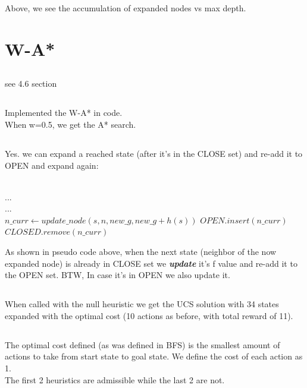 \documentclass[12pt]{article}
\begin{document}
Above, we see the accumulation of expanded nodes vs max depth.

\section{W-A*}
\subsection{}
see 4.6 section
\subsection{}
Implemented the W-A* in code.\\
When w=0.5, we get the A* search.
\subsection{}
Yes. we can expand a reached state (after it's in the CLOSE set) and re-add it to OPEN and expand again:\\
\begin{algorithmic}
\\
    ...
\\
    ...
\Else {}\\
        \State $n\_curr \gets update\_node(s, n, new\_g ,new\_g + h(s))$
        \State $OPEN.insert(n\_curr)$
        \State $CLOSED.remove(n\_curr)$
    \EndIf
\EndIf 
\end{algorithmic}
As shown in pseudo code above, when the next state (neighbor of the now expanded node) is already in CLOSE set we {\textit{\textbf{update}}} it's f value and re-add it to the OPEN set.
BTW, In case it's in OPEN we also update it.

\subsection{}
When called with the null heuristic we get the UCS solution with 34 states expanded with the optimal cost (10 actions as before, with total reward of 11).

\subsection{}
The optimal cost defined (as was defined in BFS) is the smallest amount of actions to take from start state to goal state. We define the cost of each action as 1.\\
The first 2 heuristics are admissible while the last 2 are not.\\
\end{document}

